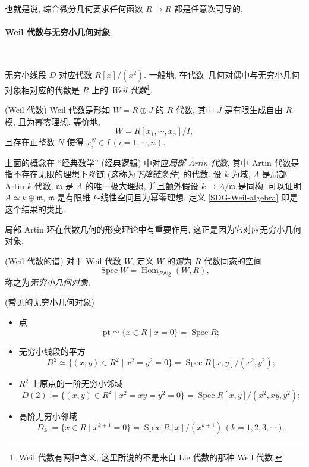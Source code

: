 也就是说, 综合微分几何要求任何函数 $R\to R$ 都是任意次可导的.

\paragraph{Weil 代数与无穷小几何对象}

~

无穷小线段 $D$ 对应代数 $R[x]/(x^2)$. 一般地, 在代数--几何对偶中与无穷小几何对象相对应的代数是 $R$ 上的 \emph{Weil 代数}\footnote{Weil 代数有两种含义, 这里所说的不是来自 Lie 代数的那种 Weil 代数.}.
\begin{definition}
	[label={SDG-Weil-algebra}]
	{(Weil 代数)}
	Weil 代数是形如 $W = R \oplus J$ 的 $R$-代数,
	其中 $J$ 是有限生成自由 $R$-模,
	且为幂零理想. 等价地,
	$$
	W = R[x_1,\cdots,x_n]/I,
	$$
	且存在正整数 $N$ 使得 $x_i^N \in I\,(i=1,\cdots,n)$.
\end{definition}

\begin{remark}
	{}
	上面的概念在 ``经典数学'' (经典逻辑) 中对应\emph{局部 Artin 代数}, 其中 Artin 代数是指不存在无限的理想下降链 (这称为\emph{下降链条件}) 的代数.
	设 $k$ 为域, $A$ 是局部 Artin $k$-代数, $\mathfrak m$ 是 $A$ 的唯一极大理想, 并且额外假设 $k \to A/\mathfrak m$ 是同构.%
	可以证明\footnotemark $A \simeq k\oplus\mathfrak m$, $\mathfrak m$ 是有限维 $k$-线性空间且为幂零理想. 定义 \ref{SDG-Weil-algebra} 即是这个结果的类比.
	
	局部 Artin 环在代数几何的形变理论中有重要作用, 这正是因为它对应无穷小几何对象.
\end{remark}


\begin{definition}
	{(Weil 代数的谱)}
	对于 Weil 代数 $W$, 定义 $W$ 的\emph{谱}为 $R$-代数同态的空间
	$$
	\operatorname{Spec}W = \operatorname{Hom}_{R\mathsf {Alg}}(W,R),
	$$
	称之为\emph{无穷小几何对象}.
\end{definition}

\begin{example}
	{(常见的无穷小几何对象)}
	\begin{itemize}
		\item 点 $$\text{pt} \simeq \{x\in R\mid x=0\} = \operatorname{Spec} R;$$
		\item 无穷小线段的平方 $$D^2 \simeq \{(x,y)\in R^2 \mid x^2=y^2=0\} = \operatorname{Spec}R[x,y]/(x^2,y^2);$$
		\item $R^2$ 上原点的一阶无穷小邻域 $$D(2) := \{(x,y)\in R^2\mid x^2=xy=y^2=0\} = \operatorname{Spec}R[x,y]/(x^2,xy,y^2);$$
		\item 高阶无穷小邻域
		$$
		D_k := \{x\in R\mid x^{k+1}=0\} = \operatorname{Spec}R[x]/(x^{k+1})\, (k=1,2,3,\cdots).
		$$
	\end{itemize}
\end{example}

